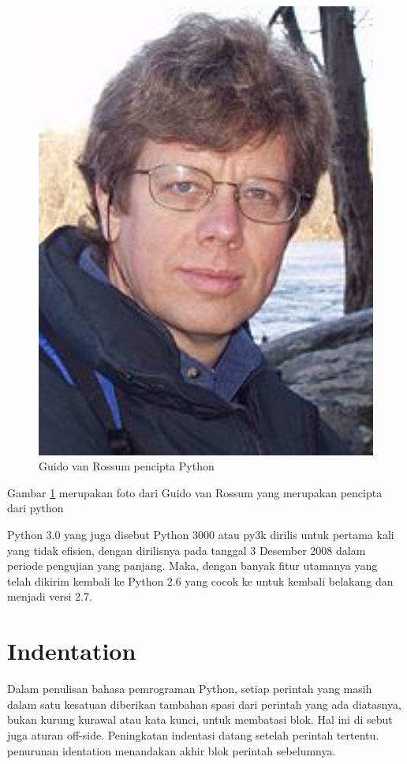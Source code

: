 	\begin{figure}[ht]
	\centerline{\includegraphics[width=1\textwidth]{figures/Guido.PNG}}
	\caption{Guido van Rossum pencipta Python}
	\label{Guido}
	\end{figure}
      
      Gambar \ref{Guido} merupakan foto dari Guido van Rossum yang merupakan pencipta dari python
      
      Python 3.0 yang juga disebut Python 3000 atau py3k dirilis untuk pertama kali yang tidak efisien, dengan dirilisnya pada tanggal 
      3 Desember 2008 dalam periode pengujian yang panjang. Maka, dengan banyak fitur utamanya yang telah dikirim kembali ke Python 2.6 
      yang cocok ke untuk kembali belakang dan menjadi versi 2.7. 
      
\section {Indentation}
      Dalam penulisan bahasa pemrograman Python, setiap perintah yang masih dalam satu kesatuan diberikan tambahan spasi dari 
      perintah yang ada diatasnya, bukan kurung kurawal atau kata kunci, untuk membatasi blok. Hal ini di sebut juga aturan off-side. 
      Peningkatan indentasi datang setelah perintah tertentu. penurunan identation menandakan akhir blok perintah sebelumnya.

